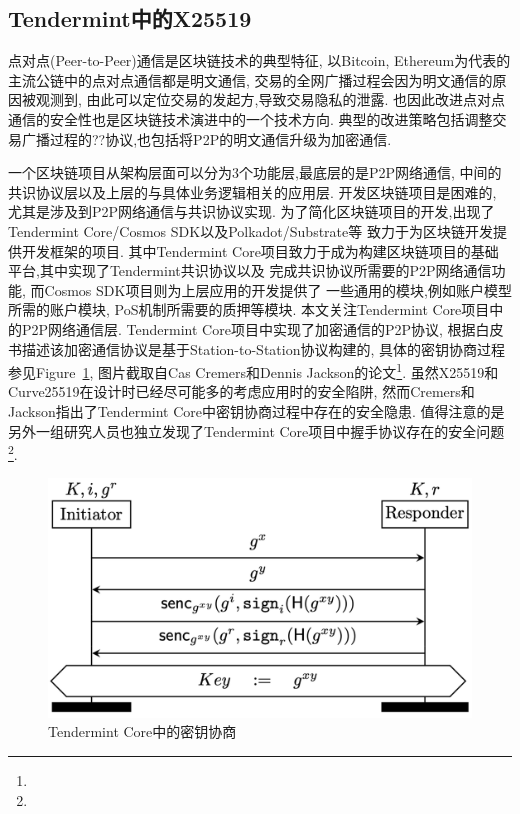 \subsection{Tendermint中的X25519}

点对点(Peer-to-Peer)通信是区块链技术的典型特征,
以Bitcoin, Ethereum为代表的主流公链中的点对点通信都是明文通信,
交易的全网广播过程会因为明文通信的原因被观测到,
由此可以定位交易的发起方,导致交易隐私的泄露.
也因此改进点对点通信的安全性也是区块链技术演进中的一个技术方向.
典型的改进策略包括调整交易广播过程的??协议,也包括将P2P的明文通信升级为加密通信.

一个区块链项目从架构层面可以分为3个功能层,最底层的是P2P网络通信,
中间的共识协议层以及上层的与具体业务逻辑相关的应用层.
开发区块链项目是困难的, 尤其是涉及到P2P网络通信与共识协议实现.
为了简化区块链项目的开发,出现了Tendermint Core/Cosmos SDK以及Polkadot/Substrate等
致力于为区块链开发提供开发框架的项目.
其中Tendermint Core项目致力于成为构建区块链项目的基础平台,其中实现了Tendermint共识协议以及
完成共识协议所需要的P2P网络通信功能, 而Cosmos SDK项目则为上层应用的开发提供了
一些通用的模块,例如账户模型所需的账户模块, PoS机制所需要的质押等模块.
本文关注Tendermint Core项目中的P2P网络通信层.
Tendermint Core项目中实现了加密通信的P2P协议,
根据白皮书描述该加密通信协议是基于Station-to-Station协议构建的,
具体的密钥协商过程参见Figure~\ref{fig-tendermint-handshake},
图片截取自Cas Cremers和Dennis Jackson的论文\footnote{
}. 虽然X25519和Curve25519在设计时已经尽可能多的考虑应用时的安全陷阱,
然而Cremers和Jackson指出了Tendermint Core中密钥协商过程中存在的安全隐患.
值得注意的是另外一组研究人员也独立发现了Tendermint Core项目中握手协议存在的安全问题\footnote{
}.

\begin{figure}[h]
\centering
\includegraphics[width=.6\textwidth]{tendermint-handshake.png}
\caption{Tendermint Core中的密钥协商\label{fig-tendermint-handshake}}
\end{figure}